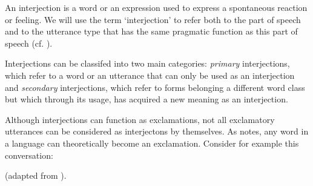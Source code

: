 An interjection is a word or an expression used to express a spontaneous reaction or feeling. We will use the term `interjection' to refer both to the part of speech and to the utterance type that has the same pragmatic function as this part of speech (cf. \cite{ameka1992}).

Interjections can be classifed into two main categories: \emph{primary} interjections, which refer to a word or an utterance that can only be used as an interjection and \emph{secondary} interjections, which refer to forms belonging a different word class but which through its usage, has acquired a new meaning as an interjection.

Although interjections can function as exclamations, not all exclamatory utterances can be considered as interjectons by themselves. As \textcite{jovanovic2004} notes, any word in a language can theoretically become an exclamation. Consider for example this conversation:

\ex (adapted from \cite{jovanovic2004}).\\

  \medskip

  \\
\xe
